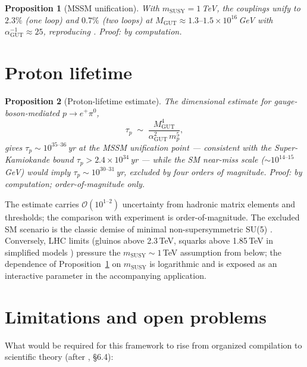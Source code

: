 \documentclass[11pt]{article}
\newtheorem{proposition}{Proposition}
\theoremstyle{remark}
\begin{document}
\begin{proposition}[MSSM unification]
\label{prop:mssm}
With $m_{\mathrm{SUSY}} = 1$\,TeV, the couplings unify to $2.3\%$ (one
loop) and $0.7\%$ (two loops) at $M_{\mathrm{GUT}} \approx
1.3\text{--}1.5\times10^{16}$\,GeV with
$\alpha_{\mathrm{GUT}}^{-1} \approx 25$, reproducing
\cite{amaldi,martin-ramond}. \emph{Proof: by computation.}
\end{proposition}

\section{Proton lifetime}
\label{sec:proton}

\begin{proposition}[Proton-lifetime estimate]
\label{prop:proton}
The dimensional estimate for gauge-boson-mediated $p\to e^+\pi^0$,
\begin{equation}
\tau_p \;\sim\; \frac{M_{\mathrm{GUT}}^4}
{\alpha_{\mathrm{GUT}}^2\,m_p^5},
\end{equation}
gives $\tau_p \sim 10^{35\text{--}36}$\,yr at the MSSM unification
point --- consistent with the Super-Kamiokande bound
$\tau_p > 2.4\times10^{34}$\,yr \cite{superk} --- while the SM
near-miss scale ($\sim 10^{14\text{--}15}$\,GeV) would imply $\tau_p
\sim 10^{30\text{--}31}$\,yr, excluded by four orders of magnitude.
\emph{Proof: by computation; order-of-magnitude only.}
\end{proposition}

The estimate carries $\mathcal{O}(10^{1\text{--}2})$ uncertainty from
hadronic matrix elements and thresholds; the comparison with experiment
is order-of-magnitude. The excluded SM scenario is the classic demise
of minimal non-supersymmetric SU(5) \cite{georgi-glashow,superk}.
Conversely, LHC limits (gluinos above 2.3\,TeV, squarks above 1.85\,TeV
in simplified models \cite{atlas}) pressure the
$m_{\mathrm{SUSY}} \sim 1$\,TeV assumption from below; the dependence
of Proposition~\ref{prop:mssm} on $m_{\mathrm{SUSY}}$ is logarithmic
and is exposed as an interactive parameter in the accompanying
application.

\section{Limitations and open problems}
\label{sec:open}

What would be required for this framework to rise from organized
compilation to scientific theory (after \cite{evaluation}, \S6.4):
\end{document}
